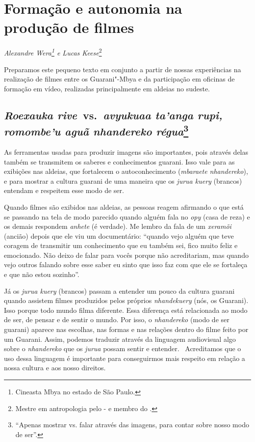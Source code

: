 \thispagestyle{empty}

\chapter*{Formação e autonomia na produção de filmes}


\begin{flushright}
\emph{Alexandre Wera\footnote{Cineasta Mbya no estado de São Paulo.} e Lucas
Keese}\footnote{Mestre em antropologia pelo - e membro do
.}
\end{flushright}
\medskip

\noindent Preparamos este pequeno texto em conjunto a partir de nossas
experiências na realização de filmes entre os Guarani"-Mbya e da
participação em oficinas de formação em vídeo, realizadas
principalmente em aldeias no sudeste.

\section{\emph{Roexauka rive}~vs.~\emph{avyukuaa ta’anga rupi, romombe’u aguã nhandereko régua}\footnotesize\protect\footnote{``\uppercase{A}penas mostrar vs. falar através das imagens, para contar sobre nosso modo de ser''.}}{}

As ferramentas usadas para produzir imagens são importantes, pois
através delas também se transmitem os saberes e conhecimentos guarani.
Isso vale para as exibições nas aldeias, que fortalecem o
autoconhecimento (\emph{mbaraete nhandereko}), e para mostrar a cultura
guarani de uma maneira que os \emph{jurua kuery} (brancos) entendam e
respeitem esse modo de ser.

Quando filmes são exibidos nas aldeias, as pessoas reagem afirmando o
que está se passando na tela de modo parecido quando alguém fala no \emph{opy}
(casa de reza) e os demais respondem \emph{anhete} (é verdade). Me lembro da
fala de um \emph{xeramõi} (ancião) depois que ele viu um documentário: ``quando
vejo alguém que teve coragem de transmitir um conhecimento que eu
também sei, fico muito feliz e emocionado. Não deixo de falar para
vocês porque não acreditariam, mas quando vejo outros falando sobre
esse saber eu sinto que isso faz com que ele se fortaleça e que não
estou sozinho''.

Já os \emph{jurua kuery} (brancos) passam a entender um pouco da cultura
guarani quando assistem filmes produzidos pelos próprios \emph{nhandekuery}
(nós, os Guarani). Isso porque todo mundo filma diferente. Essa
diferença está relacionada ao modo de ser, de pensar e de sentir o
mundo. Por isso, o \emph{nhandereko} (modo de ser guarani) aparece nas
escolhas, nas formas e nas relações dentro do filme feito por um
Guarani. Assim, podemos traduzir através da linguagem audiovisual algo
sobre o \emph{nhandereko} que os \emph{jurua} possam sentir e entender.~ Acreditamos
que o uso dessa linguagem é importante para conseguirmos mais respeito
em relação a nossa cultura e aos nosso direitos.


